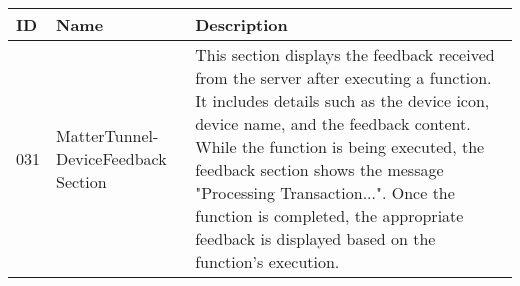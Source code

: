 \documentclass[conference]{IEEEtran}
\begin{document}
\begin{enumerate}[itemsep=2ex, parsep=1ex]
\begin{enumerate}[itemsep=2ex, parsep=1ex]
	      	      \begin{table}[h!]
	      	      	\def\arraystretch{1.24} \small
	      	      	\begin{tabular}{|p{1.2cm}|p{2.5cm}|p{4.0cm}|}
	      	      		\hline
	      	      		ID  & Name                                & Description                                                                                                                                                                                                                                                                                                                                                                                      \\
	      	      		\hline
	      	      		031 & MatterTunnel-DeviceFeedback Section & This section displays the feedback received from the server after executing a function. It includes details such as the device icon, device name, and the feedback content. While the function is being executed, the feedback section shows the message "Processing Transaction...". Once the function is completed, the appropriate feedback is displayed based on the function’s execution. \\
	      	      		\hline
	      	      	\end{tabular}
	      	      \end{table}
	      	      
	      	      \vspace{10cm}
	      	      

\end{enumerate}
\end{enumerate}
\end{document}
